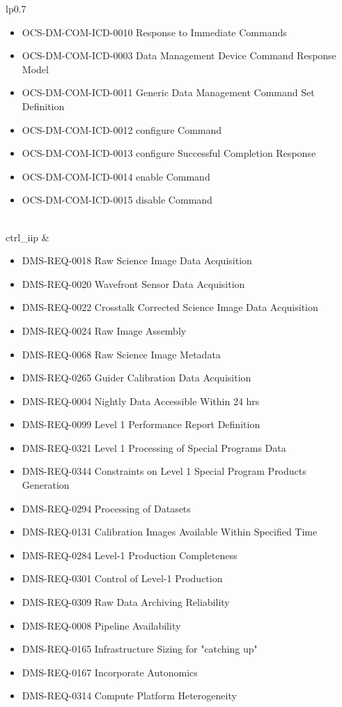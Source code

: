\begin{xtabular}{lp{0.7\textwidth}}
\begin{itemize}
\item OCS-DM-COM-ICD-0010 Response to Immediate Commands
\item OCS-DM-COM-ICD-0003 Data Management Device Command Response Model
\item OCS-DM-COM-ICD-0011 Generic Data Management Command Set Definition
\item OCS-DM-COM-ICD-0012 configure Command
\item OCS-DM-COM-ICD-0013 configure Successful Completion Response
\item OCS-DM-COM-ICD-0014 enable Command
\item OCS-DM-COM-ICD-0015 disable Command
\end{itemize} \\ \hline
ctrl_iip &
\begin{itemize}DMS-REQ-0346 Data Availability
\item DMS-REQ-0018 Raw Science Image Data Acquisition
\item DMS-REQ-0020 Wavefront Sensor Data Acquisition
\item DMS-REQ-0022 Crosstalk Corrected Science Image Data Acquisition
\item DMS-REQ-0024 Raw Image Assembly
\item DMS-REQ-0068 Raw Science Image Metadata
\item DMS-REQ-0265 Guider Calibration Data Acquisition
\item DMS-REQ-0004 Nightly Data Accessible Within 24 hrs
\item DMS-REQ-0099 Level 1 Performance Report Definition
\item DMS-REQ-0321 Level 1 Processing of Special Programs Data
\item DMS-REQ-0344 Constraints on Level 1 Special Program Products Generation
\item DMS-REQ-0294 Processing of Datasets
\item DMS-REQ-0131 Calibration Images Available Within Specified Time
\item DMS-REQ-0284 Level-1 Production Completeness
\item DMS-REQ-0301 Control of Level-1 Production
\item DMS-REQ-0309 Raw Data Archiving Reliability
\item DMS-REQ-0008 Pipeline Availability
\item DMS-REQ-0165 Infrastructure Sizing for "catching up"
\item DMS-REQ-0167 Incorporate Autonomics
\item DMS-REQ-0314 Compute Platform Heterogeneity

\end{itemize}
\end{xtabular}
